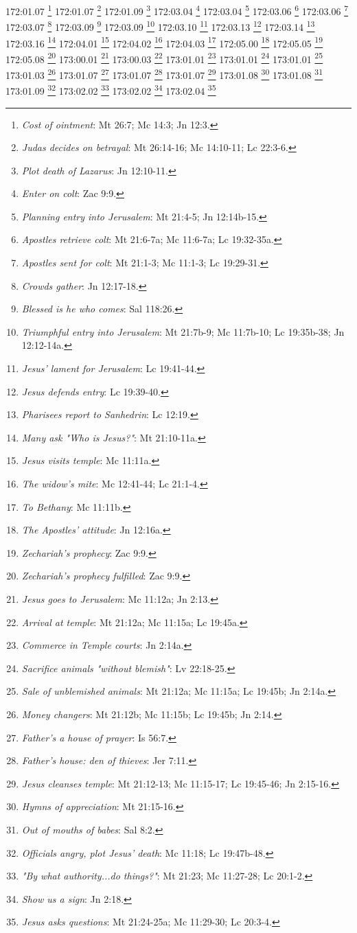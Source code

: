 172:01.07 \footnote{\textit{Cost of ointment}: Mt 26:7; Mc 14:3; Jn 12:3.}
172:01.07 \footnote{\textit{Judas decides on betrayal}: Mt 26:14-16; Mc 14:10-11; Lc 22:3-6.}
172:01.09 \footnote{\textit{Plot death of Lazarus}: Jn 12:10-11.}
172:03.04 \footnote{\textit{Enter on colt}: Zac 9:9.}
172:03.04 \footnote{\textit{Planning entry into Jerusalem}: Mt 21:4-5; Jn 12:14b-15.}
172:03.06 \footnote{\textit{Apostles retrieve colt}: Mt 21:6-7a; Mc 11:6-7a; Lc 19:32-35a.}
172:03.06 \footnote{\textit{Apostles sent for colt}: Mt 21:1-3; Mc 11:1-3; Lc 19:29-31.}
172:03.07 \footnote{\textit{Crowds gather}: Jn 12:17-18.}
172:03.09 \footnote{\textit{Blessed is he who comes}: Sal 118:26.}
172:03.09 \footnote{\textit{Triumphful entry into Jerusalem}: Mt 21:7b-9; Mc 11:7b-10; Lc 19:35b-38; Jn 12:12-14a.}
172:03.10 \footnote{\textit{Jesus' lament for Jerusalem}: Lc 19:41-44.}
172:03.13 \footnote{\textit{Jesus defends entry}: Lc 19:39-40.}
172:03.14 \footnote{\textit{Pharisees report to Sanhedrin}: Lc 12:19.}
172:03.16 \footnote{\textit{Many ask "Who is Jesus?"}: Mt 21:10-11a.}
172:04.01 \footnote{\textit{Jesus visits temple}: Mc 11:11a.}
172:04.02 \footnote{\textit{The widow's mite}: Mc 12:41-44; Lc 21:1-4.}
172:04.03 \footnote{\textit{To Bethany}: Mc 11:11b.}
172:05.00 \footnote{\textit{The Apostles' attitude}: Jn 12:16a.}
172:05.05 \footnote{\textit{Zechariah's prophecy}: Zac 9:9.}
172:05.08 \footnote{\textit{Zechariah's prophecy fulfilled}: Zac 9:9.}
173:00.01 \footnote{\textit{Jesus goes to Jerusalem}: Mc 11:12a; Jn 2:13.}
173:00.03 \footnote{\textit{Arrival at temple}: Mt 21:12a; Mc 11:15a; Lc 19:45a.}
173:01.01 \footnote{\textit{Commerce in Temple courts}: Jn 2:14a.}
173:01.01 \footnote{\textit{Sacrifice animals "without blemish"}: Lv 22:18-25.}
173:01.01 \footnote{\textit{Sale of unblemished animals}: Mt 21:12a; Mc 11:15a; Lc 19:45b; Jn 2:14a.}
173:01.03 \footnote{\textit{Money changers}: Mt 21:12b; Mc 11:15b; Lc 19:45b; Jn 2:14.}
173:01.07 \footnote{\textit{Father's a house of prayer}: Is 56:7.}
173:01.07 \footnote{\textit{Father's house: den of thieves}: Jer 7:11.}
173:01.07 \footnote{\textit{Jesus cleanses temple}: Mt 21:12-13; Mc 11:15-17; Lc 19:45-46; Jn 2:15-16.}
173:01.08 \footnote{\textit{Hymns of appreciation}: Mt 21:15-16.}
173:01.08 \footnote{\textit{Out of mouths of babes}: Sal 8:2.}
173:01.09 \footnote{\textit{Officials angry, plot Jesus' death}: Mc 11:18; Lc 19:47b-48.}
173:02.02 \footnote{\textit{"By what authority...do things?"}: Mt 21:23; Mc 11:27-28; Lc 20:1-2.}
173:02.02 \footnote{\textit{Show us a sign}: Jn 2:18.}
173:02.04 \footnote{\textit{Jesus asks questions}: Mt 21:24-25a; Mc 11:29-30; Lc 20:3-4.}
